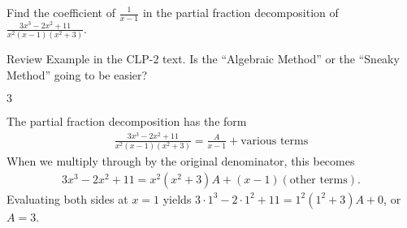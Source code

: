 

\begin{question}[2016Q4]\label{prob_s1.10:sneaky}
Find the coefficient of $\displaystyle \frac{1}{x-1}$ in the partial
fraction decomposition of $\displaystyle\frac{3x^3-2x^2+11}{x^2(x-1)(x^2+3)}$.
\end{question}

\begin{hint}
Review   Example 
in the %
CLP-2 text. Is the ``Algebraic Method'' or the ``Sneaky Method'' going to be easier?
\end{hint}

\begin{answer}
$3$
\end{answer}

\begin{solution}
The partial fraction decomposition has the form
\begin{align*}
  \frac{3x^3-2x^2+11}{x^2(x-1)(x^2+3)} = \frac A{x-1} + \text{various terms}
\end{align*}
When we multiply through by the original denominator, this becomes
\begin{align*}
{3x^3-2x^2+11} = {x^2(x^2+3)}A + (x-1)(\text{other terms}).
\end{align*}
Evaluating both sides at $x=1$ yields $3\cdot1^3-2\cdot1^2+11=1^2(1^2+3)A+0$, or $A=3$.
\end{solution}


